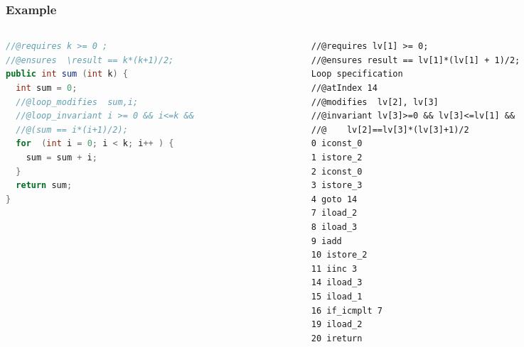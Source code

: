 \documentclass{beamer}
\begin{document}

%      


\begin{frame}\frametitle{Example}
\begin{columns}
\begin{column}{5.1cm}
{\tiny
\begin{lstlisting}[language=java]
//@requires k >= 0 ;
//@ensures  \result == k*(k+1)/2;
public int sum (int k) {
  int sum = 0;		
  //@loop_modifies  sum,i;
  //@loop_invariant i >= 0 && i<=k && 
  //@(sum == i*(i+1)/2);
  for  (int i = 0; i < k; i++ ) {
    sum = sum + i;
  } 	
  return sum;
}
\end{lstlisting}}
\end{column}

\begin{column}{5.1cm}
{\tiny
\begin{lstlisting}[language=jvmis]
//@requires lv[1] >= 0;
//@ensures result == lv[1]*(lv[1] + 1)/2;
Loop specification
//@atIndex 14 
//@modifies  lv[2], lv[3]
//@invariant lv[3]>=0 && lv[3]<=lv[1] &&
//@    lv[2]==lv[3]*(lv[3]+1)/2
0 iconst_0
1 istore_2
2 iconst_0
3 istore_3
4 goto 14 
7 iload_2
8 iload_3
9 iadd
10 istore_2 
11 iinc 3 
14 iload_3
15 iload_1
16 if_icmplt 7 
19 iload_2
20 ireturn
\end{lstlisting}}
\end{column}
\end{columns}
\end{frame}

\end{document}
